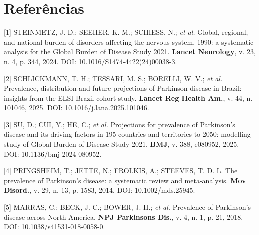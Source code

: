 \documentclass[12pt,a4paper,oneside]{article}
\begin{document}
\section*{Referências}\label{sec:ref}
\begin{singlespace}\small

\noindent\hangindent=1.25cm\label{ref:gbd}
[1] STEINMETZ, J. D.; SEEHER, K. M.; SCHIESS, N.; \textit{et al.}
Global, regional, and national burden of disorders affecting the
nervous system, 1990: a systematic analysis for the
Global Burden of Disease Study 2021. \textbf{Lancet Neurology}, v.
23, n. 4, p. 344, 2024. DOI: 10.1016/S1474-4422(24)00038-3.
\par\smallskip

\noindent\hangindent=1.25cm\label{ref:elsi}
[2] SCHLICKMANN, T. H.; TESSARI, M. S.; BORELLI, W. V.; \textit{et al.}
Prevalence, distribution and future projections of Parkinson disease
in Brazil: insights from the ELSI-Brazil cohort study.
\textbf{Lancet Reg Health Am.}, v. 44, n. 101046, 2025. DOI:
10.1016/j.lana.2025.101046.\par\smallskip

\noindent\hangindent=1.25cm\label{ref:su}
[3] SU, D.; CUI, Y.; HE, C.; \textit{et al.} Projections for
prevalence of Parkinson's disease and its driving factors in 195
countries and territories to 2050: modelling study of Global Burden
of Disease Study 2021. \textbf{BMJ}, v. 388, e080952, 2025. DOI:
10.1136/bmj-2024-080952.\par\smallskip

\noindent\hangindent=1.25cm\label{ref:pringsheim}
[4] PRINGSHEIM, T.; JETTE, N.; FROLKIS, A.; STEEVES, T. D. L. The
prevalence of Parkinson's disease: a systematic review and
meta-analysis. \textbf{Mov Disord.}, v. 29, n. 13,
p. 1583, 2014. DOI: 10.1002/mds.25945.\par\smallskip

\noindent\hangindent=1.25cm\label{ref:marras}
[5] MARRAS, C.; BECK, J. C.; BOWER, J. H.; \textit{et al.}
Prevalence of Parkinson's disease across North America. \textbf{NPJ
Parkinsons Dis.}, v. 4, n. 1, p. 21, 2018. DOI:
10.1038/s41531-018-0058-0.\par\smallskip


\end{singlespace}
\end{document}
